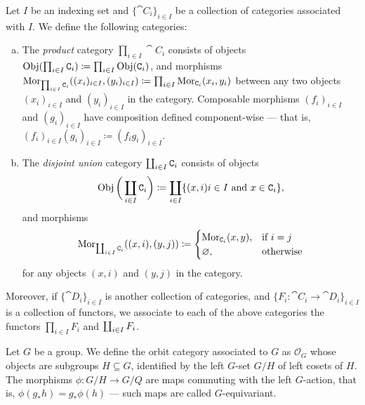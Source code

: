 \begin{definition}
    \label{def:product-disjoint-categories}
    Let \(I\) be an indexing set and \(\{\cat C_{i}\}_{i \in I}\) be a collection of
    categories associated with \(I\). We define the following categories:
    \begin{enumerate}[(a)]\setlength\itemsep{0em}
        \item The \emph{product} category \(\prod_{i \in I} \cat C_i\) consists of
              objects
              \(\operatorname{Obj}(\prod_{i \in I} \texttt C_i) \coloneq \prod_{i \in I} \operatorname{Obj}(\texttt C_i)\),
              and morphisms
              \(\operatorname{Mor}_{\prod_{i \in I} \texttt C_i}((x_i)_{i \in I}, (y_i)_{i \in I}) \coloneq
              \prod_{i \in I} \operatorname{Mor}_{\texttt C_i}(x_i, y_i)\) between any two objects
              \((x_i)_{i \in I}\) and \((y_i)_{i \in I}\) in the category. Composable
              morphisms \((f_i)_{i \in I}\) and \((g_i)_{i \in I}\) have composition defined
              component-wise --- that is,
              \((f_i)_{i \in I} (g_i)_{i \in I} \coloneq (f_i g_i)_{i \in I}\).
        \item The \emph{disjoint union} category \(\coprod_{i \in I} \texttt C_i\) consists
              of objects
              \[
                  \operatorname{Obj}\bigg(\coprod_{i \in I} \texttt C_i\bigg) \coloneq
                  \coprod_{i \in I} \{(x, i) \relax i \in I \text{ and } x \in \texttt C_i\},
              \]
              and morphisms
              \[
                  \operatorname{Mor}_{\coprod_{i \in I} \texttt C_i}((x, i), (y, j)) \coloneq
                  \begin{cases}
                      \operatorname{Mor}_{\texttt C_i}(x, y), & \text{if } i = j \\
                      \varnothing,             & \text{otherwise}
                  \end{cases}
              \]
              for any objects \((x, i)\) and \((y, j)\) in the category.
    \end{enumerate}
    Moreover, if \(\{\cat D_{i}\}_{i \in I}\) is another collection of categories,
    and \(\{F_{i}: \cat C_i \to \cat D_i\}_{i \in I}\) is a collection of functors,
    we associate to each of the above categories the functors \(\prod_{i \in I}
    F_i\) and \(\coprod_{i \in I} F_i\).
\end{definition}

\begin{example}
    \label{exp:orbit-category}
    Let \(G\) be a group. We define the orbit category associated to \(G\) as
    \(\mathcal{O}_G\) whose objects are subgroups \(H \subseteq G\), identified by
    the left \(G\)-set \(G/H\) of left cosets of \(H\). The morphisms \(\phi: G/H \to
    G/Q\) are maps commuting with the left \(G\)-action, that is, \(\phi(g_{*}h) =
    g_{*} \phi(h)\) --- such maps are called \(G\)-equivariant.
\end{example}

